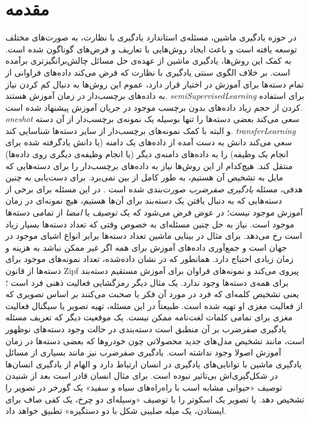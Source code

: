 \chapter{مقدمه } \label{intro}

 در حوزه یادگیری ماشین، مسئله‌ی استاندارد یادگیری با نظارت، به صورت‌های مختلف توسعه یافته است و باعث ایجاد روش‌هایی با تعاریف و فرض‌های گوناگون شده است. به کمک این روش‌ها، یادگیری ماشین از عهده‌ی حل مسائل چالش‌برانگیزتری برآمده است. بر خلاف الگوی سنتی یادگیری با نظارت که فرض می‌کند داده‌های فراوانی از تمام دسته‌ها برای آموزش در اختیار قرار دارد، عموم این روش‌ها به دنبال کم کردن نیاز به داده‌های برچسب‌دار در زمان آموزش هستند.
\emph{\gls{semiSupervisedLearning}}\cite{chapel06}
برای استفاده کردن از حجم زیاد داده‌های بدون برچسب موجود در جریان آموزش پیشنهاد شده است.
\emph{\gls{oneshot}} \cite{miller12}
سعی می‌کند بعضی دسته‌ها را تنها بوسیله یک نمونه‌ی برچسب‌دار از آن دسته و البته با کمک نمونه‌های برچسب‌دار از سایر دسته‌ها شناسایی کند.
\emph{\gls{transferLearning}} \cite{pan10survey}
سعی می‌کند دانش به دست آمده از داده‌های یک دامنه (یا دانش یادگرفته شده برای انجام یک وظیفه) را به داده‌های دامنه‌ی دیگر (یا انجام وظیفه‌ی دیگری روی داده‌ها) منتقل کند.
هیچ‌کدام از این روش‌ها نیاز به داده‌های برچسب‌دار را برای دسته‌هایی که مایل به تشخیص آن هستیم، به طور کامل از بین نمی‌برد. برای دست‌یابی به چنین هدفی،
مسئله \textit{یادگیری صفرضرب}  صورت‌بندی شده است \cite{bengio08}. در این مسئله برای برخی از دسته‌هایی که به دنبال یافتن یک دسته‌بند برای آن‌ها هستیم، هیچ نمونه‌ای در زمان آموزش موجود نیست؛ در عوض  فرض می‌شود که یک \emph{ توصیف} یا \emph{امضا}  از تمامی دسته‌ها موجود است. نیاز به حل  چنین مسئله‌ای به خصوص وقتی که تعداد دسته‌ها بسیار زیاد است رخ می‌دهد. برای مثال در بینایی ماشین تعداد دسته‌ها برابر انواع اشیای موجود در جهان است و جمع‌آوری داده‌های آموزش برای همه اگر غیر ممکن نباشد به هزینه و زمان زیادی احتیاج دارد. همانطور که در
\cite{sala11}
نشان داده‌شده، تعداد نمونه‌های موجود برای دسته‌ها از قانون Zipf پیروی می‌کند و نمونه‌های فراوان برای آموزش مستقیم دسته‌بند برای همه‌ی دسته‌ها وجود ندارد.
 یک مثال دیگر رمزگشایی فعالیت ذهنی فرد است
\cite{hinton09}؛
یعنی تشخیص کلمه‌ای که فرد در مورد آن فکر یا صحبت می‌کنند بر اساس تصویری که از فعالیت مغزی او تهیه شده است. طبیعتاً در این مسئله، تهیه تصویر یا سیگنال فعالیت مغزی برای تمامی کلمات لغت‌نامه ممکن نیست. یک موقعیت دیگر که تعریف مسئله یادگیری صفرضرب بر آن منطبق است دسته‌بندی در حالت وجود دسته‌های نوظهور است، مانند تشخیص مدل‌های جدید محصولاتی چون خودروها که بعضی دسته‌ها در زمان آموزش اصولا وجود نداشته است. یادگیری صفرضرب نیز مانند بسیاری از مسائل یادگیری ماشین با توانایی‌های یادگیری در انسان ارتباط دارد و الهام از یادگیری انسان‌ها در شکل‌گیری‌اش بی‌تاثیر نبوده است. برای مثال انسان قادر است بعد از شنیدن توصیف «حیوانی مشابه اسب با راه‌راه‌های سیاه و سفید» یک گورخر در تصویر را تشخیص دهد. یا تصویر یک اسکوتر را با توصیف «وسیله‌ای دو چرخ، یک کفی صاف برای ایستادن، یک میله صلیبی شکل با دو دستگیره» تطبیق خواهد داد.

